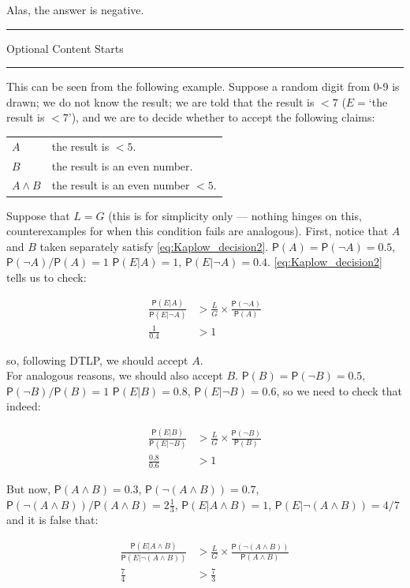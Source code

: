 \documentclass[10pt,dvipsnames,enabledeprecatedfontcommands]{scrartcl}
\newcommand{\n}{\neg}
\newcommand{\et}{\wedge}
\newcommand{\pr}[1]{\mathsf{P}(#1)}
\newcommand{\intermezzoa}{
	\begin{minipage}[c]{13cm}
	\begin{center}\rule{10cm}{0.4pt}



	\tiny{\sc Optional Content Starts}
	
	\vspace{-1mm}
	
	\rule{10cm}{0.4pt}\end{center}
	\end{minipage}\nopagebreak 
	}
\begin{document}
Alas, the answer is negative.

\intermezzoa

This can be seen from the following example. Suppose a random digit from
0-9 is drawn; we do not know the result; we are told that the result is
\(<7\) (\(E=\)`the result is \(<7\)'), and we are to decide whether to
accept the following claims:

\begin{center}
 \begin{tabular}{@{}ll@{}}
 \toprule
 $A$ & the result is $<5$. \\
 $B$  & the result is an even number.\\
 $A\et B$ & the result is an even number $<5$. \\
 \bottomrule
 \end{tabular}
 \end{center}

Suppose that \(L=G\) (this is for simplicity only --- nothing hinges on
this, counterexamples for when this condition fails are analogous).
First, notice that \(A\) and \(B\) taken separately satisfy
\eqref{eq:Kaplow_decision2}. \(\pr{A}=\pr{\n A}=0.5\),
\(\pr{\n A}/\pr{A}=1\) \(\pr{E\vert A}=1\), \(\pr{E\vert \n A}=0.4\).
\eqref{eq:Kaplow_decision2} tells us to check:

\begin{align*}
 \frac{\pr{E\vert A}}{\pr{E\vert \n A}}&> \frac{L}{G}\times \frac{\pr{\n A}}{\pr{A}}\\
 \frac{1}{0.4} & > 1
 \end{align*}

\noindent so, following DTLP, we should accept \(A\).\\
For analogous reasons, we should also accept \(B\).
\(\pr{B}=\pr{\n B}=0.5\), \(\pr{\n B}/\pr{B}=1\) \(\pr{E\vert B}=0.8\),
\(\pr{E\vert \n B}=0.6\), so we need to check that indeed:

\begin{align*}
 \frac{\pr{E\vert B}}{\pr{E\vert \n B}}&> \frac{L}{G}\times \frac{\pr{\n B}}{\pr{B}}\\
 \frac{0.8}{0.6} & > 1 
 \end{align*}

But now, \(\pr{A\et B}=0.3\), \(\pr{\n (A \et B)}=0.7\),
\(\pr{\n (A\et B)}/\pr{A\et B}=2\frac{1}{3}\),
\(\pr{E\vert A \et B}=1\), \(\pr{E\vert \n (A\et B)}=4/7\) and it is
false that:

\begin{align*}
 \frac{\pr{E\vert A \et B}}{\pr{E\vert \n (A\et B)}}&> \frac{L}{G}\times \frac{\pr{\n (A \et B)}}{\pr{A \et B}}\\
 \frac{7}{4} & > \frac{7}{3} 
 \end{align*}
\end{document}
